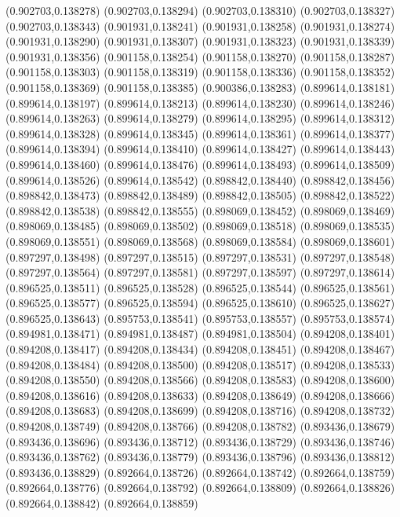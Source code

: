 (0.902703,0.138278)
(0.902703,0.138294)
(0.902703,0.138310)
(0.902703,0.138327)
(0.902703,0.138343)
(0.901931,0.138241)
(0.901931,0.138258)
(0.901931,0.138274)
(0.901931,0.138290)
(0.901931,0.138307)
(0.901931,0.138323)
(0.901931,0.138339)
(0.901931,0.138356)
(0.901158,0.138254)
(0.901158,0.138270)
(0.901158,0.138287)
(0.901158,0.138303)
(0.901158,0.138319)
(0.901158,0.138336)
(0.901158,0.138352)
(0.901158,0.138369)
(0.901158,0.138385)
(0.900386,0.138283)
(0.899614,0.138181)
(0.899614,0.138197)
(0.899614,0.138213)
(0.899614,0.138230)
(0.899614,0.138246)
(0.899614,0.138263)
(0.899614,0.138279)
(0.899614,0.138295)
(0.899614,0.138312)
(0.899614,0.138328)
(0.899614,0.138345)
(0.899614,0.138361)
(0.899614,0.138377)
(0.899614,0.138394)
(0.899614,0.138410)
(0.899614,0.138427)
(0.899614,0.138443)
(0.899614,0.138460)
(0.899614,0.138476)
(0.899614,0.138493)
(0.899614,0.138509)
(0.899614,0.138526)
(0.899614,0.138542)
(0.898842,0.138440)
(0.898842,0.138456)
(0.898842,0.138473)
(0.898842,0.138489)
(0.898842,0.138505)
(0.898842,0.138522)
(0.898842,0.138538)
(0.898842,0.138555)
(0.898069,0.138452)
(0.898069,0.138469)
(0.898069,0.138485)
(0.898069,0.138502)
(0.898069,0.138518)
(0.898069,0.138535)
(0.898069,0.138551)
(0.898069,0.138568)
(0.898069,0.138584)
(0.898069,0.138601)
(0.897297,0.138498)
(0.897297,0.138515)
(0.897297,0.138531)
(0.897297,0.138548)
(0.897297,0.138564)
(0.897297,0.138581)
(0.897297,0.138597)
(0.897297,0.138614)
(0.896525,0.138511)
(0.896525,0.138528)
(0.896525,0.138544)
(0.896525,0.138561)
(0.896525,0.138577)
(0.896525,0.138594)
(0.896525,0.138610)
(0.896525,0.138627)
(0.896525,0.138643)
(0.895753,0.138541)
(0.895753,0.138557)
(0.895753,0.138574)
(0.894981,0.138471)
(0.894981,0.138487)
(0.894981,0.138504)
(0.894208,0.138401)
(0.894208,0.138417)
(0.894208,0.138434)
(0.894208,0.138451)
(0.894208,0.138467)
(0.894208,0.138484)
(0.894208,0.138500)
(0.894208,0.138517)
(0.894208,0.138533)
(0.894208,0.138550)
(0.894208,0.138566)
(0.894208,0.138583)
(0.894208,0.138600)
(0.894208,0.138616)
(0.894208,0.138633)
(0.894208,0.138649)
(0.894208,0.138666)
(0.894208,0.138683)
(0.894208,0.138699)
(0.894208,0.138716)
(0.894208,0.138732)
(0.894208,0.138749)
(0.894208,0.138766)
(0.894208,0.138782)
(0.893436,0.138679)
(0.893436,0.138696)
(0.893436,0.138712)
(0.893436,0.138729)
(0.893436,0.138746)
(0.893436,0.138762)
(0.893436,0.138779)
(0.893436,0.138796)
(0.893436,0.138812)
(0.893436,0.138829)
(0.892664,0.138726)
(0.892664,0.138742)
(0.892664,0.138759)
(0.892664,0.138776)
(0.892664,0.138792)
(0.892664,0.138809)
(0.892664,0.138826)
(0.892664,0.138842)
(0.892664,0.138859)
